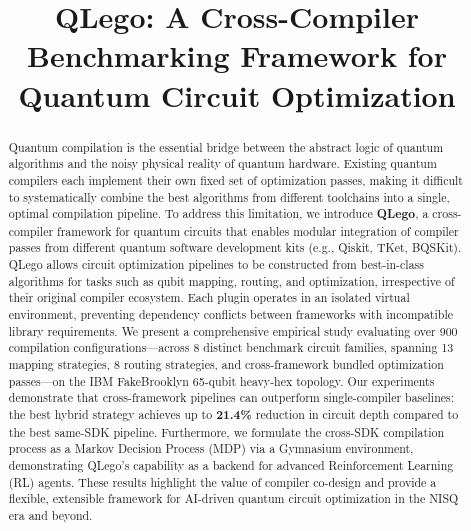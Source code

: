 \documentclass[conference]{IEEEtran}
\begin{document}
\title{QLego: A Cross-Compiler Benchmarking Framework for Quantum Circuit Optimization}

\author{
}

\maketitle

\begin{abstract}
Quantum compilation is the essential bridge between the abstract logic of quantum algorithms and the noisy physical reality of quantum hardware. Existing quantum compilers each implement their own fixed set of optimization passes, making it difficult to systematically combine the best algorithms from different toolchains into a single, optimal compilation pipeline. To address this limitation, we introduce \textbf{QLego}, a cross-compiler framework for quantum circuits that enables modular integration of compiler passes from different quantum software development kits (e.g., Qiskit, TKet, BQSKit). QLego allows circuit optimization pipelines to be constructed from best-in-class algorithms for tasks such as qubit mapping, routing, and optimization, irrespective of their original compiler ecosystem. Each plugin operates in an isolated virtual environment, preventing dependency conflicts between frameworks with incompatible library requirements. We present a comprehensive empirical study evaluating over 900 compilation configurations---across 8 distinct benchmark circuit families, spanning 13 mapping strategies, 8 routing strategies, and cross-framework bundled optimization passes---on the IBM FakeBrooklyn 65-qubit heavy-hex topology. Our experiments demonstrate that cross-framework pipelines can outperform single-compiler baselines: the best hybrid strategy achieves up to \textbf{21.4\%} reduction in circuit depth compared to the best same-SDK pipeline. Furthermore, we formulate the cross-SDK compilation process as a Markov Decision Process (MDP) via a Gymnasium environment, demonstrating QLego's capability as a backend for advanced Reinforcement Learning (RL) agents. These results highlight the value of compiler co-design and provide a flexible, extensible framework for AI-driven quantum circuit optimization in the NISQ era and beyond.
\end{abstract}
\end{document}
